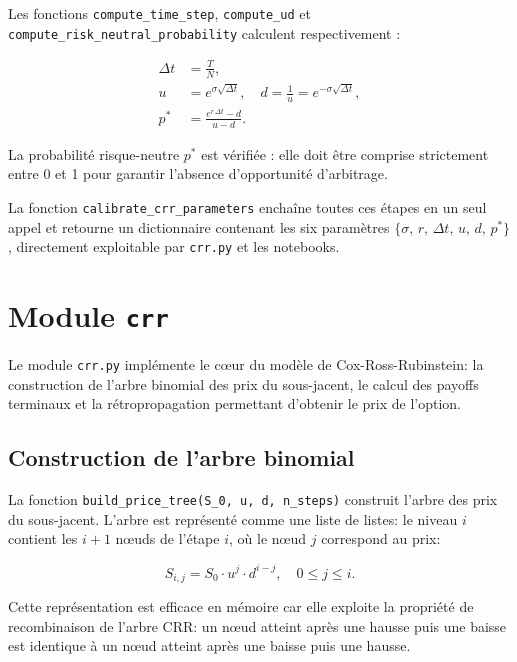 \documentclass[11pt]{report}
\begin{document}
Les fonctions \texttt{compute\_time\_step}, \texttt{compute\_ud} et
\texttt{compute\_risk\_neutral\_probability} calculent respectivement :

\begin{align*}
\Delta t &= \frac{T}{N}, \\
u &= e^{\sigma \sqrt{\Delta t}}, \quad d = \frac{1}{u} = e^{-\sigma \sqrt{\Delta t}}, \\
p^* &= \frac{e^{r\,\Delta t} - d}{u - d}.
\end{align*}

La probabilité risque-neutre $p^*$ est vérifiée : elle doit être comprise
strictement entre 0 et 1 pour garantir l'absence d'opportunité d'arbitrage.

La fonction \texttt{calibrate\_crr\_parameters} enchaîne toutes ces étapes en un seul appel
et retourne un dictionnaire contenant les six paramètres
$\{\sigma,\, r,\, \Delta t,\, u,\, d,\, p^*\}$,
directement exploitable par \texttt{crr.py} et les notebooks.

\section{Module \texttt{crr}}

Le module \texttt{crr.py} implémente le cœur du modèle de Cox-Ross-Rubinstein:
la construction de l'arbre binomial des prix du sous-jacent, le calcul des
payoffs terminaux et la rétropropagation permettant d'obtenir le prix de l'option.

\subsection{Construction de l'arbre binomial}

La fonction \texttt{build\_price\_tree(S\_0, u, d, n\_steps)} construit l'arbre
des prix du sous-jacent. L'arbre est représenté comme une liste de listes:
le niveau $i$ contient les $i+1$ nœuds de l'étape $i$, où le nœud $j$
correspond au prix:

\[
S_{i,j} = S_0 \cdot u^j \cdot d^{i-j}, \quad 0 \leq j \leq i.
\]

Cette représentation est efficace en mémoire car elle exploite la propriété de
recombinaison de l'arbre CRR: un nœud atteint après une hausse puis une baisse
est identique à un nœud atteint après une baisse puis une hausse.
\end{document}
